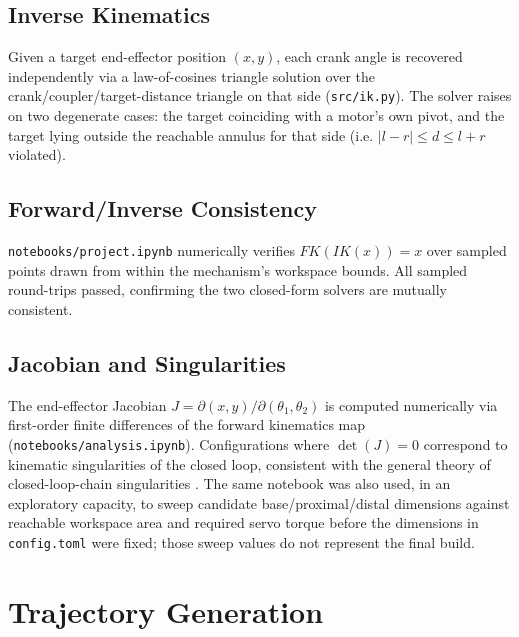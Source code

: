 \documentclass[11pt]{article}
\begin{document}
\subsection{Inverse Kinematics}

Given a target end-effector position $(x, y)$, each crank angle is recovered independently via a law-of-cosines triangle solution over the crank/coupler/target-distance triangle on that side (\texttt{src/ik.py}). The solver raises on two degenerate cases: the target coinciding with a motor's own pivot, and the target lying outside the reachable annulus for that side (i.e. $|l - r| \le d \le l + r$ violated).

\subsection{Forward/Inverse Consistency}

\texttt{notebooks/project.ipynb} numerically verifies $FK(IK(x)) = x$ over sampled points drawn from within the mechanism's workspace bounds. All sampled round-trips passed, confirming the two closed-form solvers are mutually consistent.

\subsection{Jacobian and Singularities}

The end-effector Jacobian $J = \partial(x,y)/\partial(\theta_1,\theta_2)$ is computed numerically via first-order finite differences of the forward kinematics map (\texttt{notebooks/analysis.ipynb}). Configurations where $\det(J) = 0$ correspond to kinematic singularities of the closed loop, consistent with the general theory of closed-loop-chain singularities \cite{gosselin1990singularity}. The same notebook was also used, in an exploratory capacity, to sweep candidate base/proximal/distal dimensions against reachable workspace area and required servo torque before the dimensions in \texttt{config.toml} were fixed; those sweep values do not represent the final build.


\section{Trajectory Generation}
\end{document}

